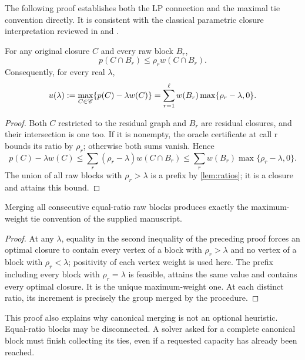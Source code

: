 The following proof establishes both the LP connection and the maximal tie
convention directly. It is consistent with the classical parametric closure
interpretation reviewed in \citet{DoseFuriniLocatelli2026} and
\citet{GalloEtAl1989}.

\begin{lemma}\label{lem:blockbound}
For any original closure $C$ and every raw block $B_r$,
\[
 p(C\cap B_r)\le\rho_r w(C\cap B_r).
\]
Consequently, for every real $\lambda$,
\begin{equation}\label{eq:parametric-sum}
 u(\lambda):=\max_{C\in\mathscr C}\{p(C)-\lambda w(C)\}
 =\sum_{r=1}^\ell w(B_r)\max\{\rho_r-\lambda,0\}.
\end{equation}
\end{lemma}
\begin{proof}
Both $C$ restricted to the residual graph and $B_r$ are residual closures,
and their intersection is one too. If it is nonempty, the oracle certificate
at call r bounds its ratio by $\rho_r$; otherwise both sums vanish. Hence
\[
 p(C)-\lambda w(C)
 \le\sum_r(\rho_r-\lambda)w(C\cap B_r)
 \le\sum_r w(B_r)\max\{\rho_r-\lambda,0\}.
\]
The union of all raw blocks with $\rho_r>\lambda$ is a prefix by
\cref{lem:ratios}; it is a closure and attains this bound.
\end{proof}

\begin{corollary}\label{cor:canonical}
Merging all consecutive equal-ratio raw blocks produces exactly the
maximum-weight tie convention of the supplied manuscript.
\end{corollary}
\begin{proof}
At any $\lambda$, equality in the second inequality of the preceding proof
forces an optimal closure to contain every vertex of a block with
$\rho_r>\lambda$ and no vertex of a block with $\rho_r<\lambda$; positivity
of each vertex weight is used here. The prefix including every block with
$\rho_r=\lambda$ is feasible, attains the same value and contains every
optimal closure. It is the unique maximum-weight one. At each distinct
ratio, its increment is precisely the group merged by the procedure.
\end{proof}

This proof also explains why canonical merging is not an optional heuristic.
Equal-ratio blocks may be disconnected. A solver asked for a complete
canonical block must finish collecting its ties, even if a requested
capacity has already been reached.

